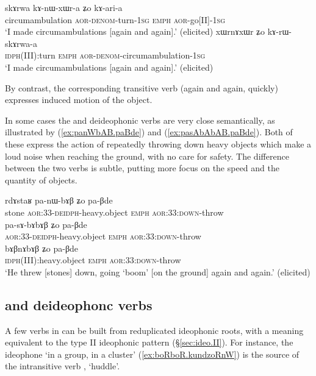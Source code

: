 \begin{exe}
\ex \label{ex:kAnWxWra}
\gll skɤrwa kɤ-nɯ-xɯr-a ʑo kɤ-ari-a \\
circumambulation \textsc{aor}-\textsc{denom}-turn-\textsc{1sg} \textsc{emph} \textsc{aor}-go[II]-\textsc{1sg} \\
\glt `I made circumambulations [again and again].' (elicited)
\ex \label{ex:xWrnAxWr}
\gll xɯrnɤxɯr ʑo kɤ-rɯ-skɤrwa-a \\
\textsc{idph}(III):turn \textsc{emph} \textsc{aor}-\textsc{denom}-circumambulation-\textsc{1sg} \\
\glt `I made circumambulations [again and again].' (elicited)
\end{exe}

By contrast, the corresponding transitive verb  (again and again, quickly) expresses induced motion of the object.
 
In some cases the  and  deideophonic verbs are very close semantically, as illustrated by  (\ref{ex:panWbAB.paBde}) and  (\ref{ex:pasAbAbAB.paBde}). Both of these express the action of repeatedly throwing down heavy objects which make a loud noise when reaching the ground, with no care for safety. The difference between the two verbs is subtle,  putting more focus on the speed and the quantity of objects.
 
\begin{exe}
\ex \label{ex:nWbAB.bABnAbAB}
\begin{xlist}
\ex \label{ex:panWbAB.paBde}
\gll rdɤstaʁ pa-nɯ-bɤβ ʑo pa-βde \\
stone \textsc{aor}:3\fl{}3-\textsc{deidph}-heavy.object \textsc{emph}  \textsc{aor}:3\fl{}3:\textsc{down}-throw \\
\ex \label{ex:pasAbAbAB.paBde}
\gll   pa-sɤ-bɤbɤβ ʑo pa-βde \\
  \textsc{aor}:3\fl{}3-\textsc{deidph}-heavy.object \textsc{emph}  \textsc{aor}:3\fl{}3:\textsc{down}-throw \\
\ex \label{ex:bABnAbAB.paBde}
\gll bɤβnɤbɤβ ʑo pa-βde \\
\textsc{idph}(III):heavy.object \textsc{emph}  \textsc{aor}:3\fl{}3:\textsc{down}-throw \\
\glt `He threw [stones] down, going `boom' [on the ground] again and again.' (elicited)
\end{xlist}
\end{exe}


\subsection{ and  deideophonc verbs} \label{sec:a.nA.deidph}
A few verbs in  can be built from reduplicated ideophonic roots, with a meaning equivalent to the type II ideophonic pattern (§\ref{sec:ideo.II}). For instance, the ideophone  `in a group, in a cluster'  (\ref{ex:boRboR.kundzoRnW}) is the source of the intransitive verb , `huddle'. 

